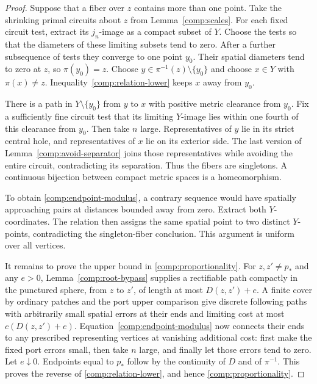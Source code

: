 \documentclass[11pt]{article}
\numberwithin{equation}{section}
\theoremstyle{definition}
\theoremstyle{remark}
\newcommand{\1}{\mathbf 1}
\begin{document}
\begin{proof}
Suppose that a fiber over $z$ contains more than one point.  Take
the shrinking primal circuits about $z$ from
Lemma~\ref{comp:scales}.  For each fixed circuit test, extract its
$j_n$-image as a compact subset of $Y$.  Choose the tests so that
the diameters of these limiting subsets tend to zero.  After a
further subsequence of tests they converge to one point $y_0$.
Their spatial diameters tend to zero at $z$, so $\pi(y_0)=z$.
Choose $y\in\pi^{-1}(z)\setminus\{y_0\}$ and choose $x\in Y$
with $\pi(x)\ne z$.  Inequality~\eqref{comp:relation-lower} keeps
$x$ away from $y_0$.

There is a path in $Y\setminus\{y_0\}$ from $y$ to $x$ with
positive metric clearance from $y_0$.  Fix a sufficiently fine
circuit test that its limiting $Y$-image lies within one fourth of
this clearance from $y_0$.  Then take $n$ large.  Representatives
of $y$ lie in its strict central hole, and representatives of $x$
lie on its exterior side.  The last version of
Lemma~\ref{comp:avoid-separator} joins those representatives while
avoiding the entire circuit, contradicting its separation.
Thus the fibers are singletons.  A continuous bijection between
compact metric spaces is a homeomorphism.

To obtain \eqref{comp:endpoint-modulus}, a contrary sequence would
have spatially approaching pairs at distances bounded away from
zero.  Extract both $Y$-coordinates.  The relation then assigns
the same spatial point to two distinct $Y$-points, contradicting
the singleton-fiber conclusion.  This argument is uniform over
all vertices.

It remains to prove the upper bound in
\eqref{comp:proportionality}.  For $z,z'\ne p_*$ and any $e>0$,
Lemma~\ref{comp:root-bypass} supplies a rectifiable path compactly
in the punctured sphere, from $z$ to $z'$, of length at most
$D(z,z')+e$.  A finite cover by ordinary patches and the port upper
comparison give discrete following paths with arbitrarily small
spatial errors at their ends and limiting cost at most
$c(D(z,z')+e)$.  Equation~\eqref{comp:endpoint-modulus} now connects
their ends to any prescribed representing vertices at vanishing
additional cost: first make the fixed port errors small, then
take $n$ large, and finally let those errors tend to zero.
Let $e\downarrow0$.  Endpoints equal to $p_*$ follow by the
continuity of $D$ and of $\pi^{-1}$.  This proves the reverse of
\eqref{comp:relation-lower}, and hence
\eqref{comp:proportionality}.
\end{proof}
\end{document}
